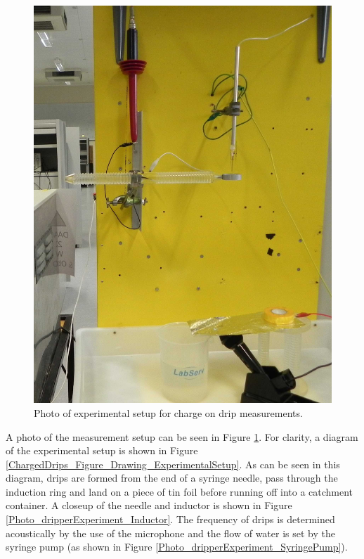 \begin{figure}
    \centering
    \includegraphics[scale=0.15]{content/appendices/chargedWaterDrops/graphics/Photo_dripperExperiment_Setup_draft.JPG}
    \caption{\label{Photo_dripperExperiment_Setup}Photo of experimental setup
    for charge on drip measurements.}
\end{figure}


A photo of the measurement setup can be seen in Figure \ref{Photo_dripperExperiment_Setup}.
For clarity, a diagram of the experimental setup is shown in Figure
\ref{ChargedDrips_Figure_Drawing_ExperimentalSetup}. As can be seen
in this diagram, drips are formed from the end of a syringe needle,
pass through the induction ring and land on a piece of tin foil before
running off into a catchment container. A closeup of the needle and
inductor is shown in Figure \ref{Photo_dripperExperiment_Inductor}.
The frequency of drips is determined acoustically by the use of the
microphone and the flow of water is set by the syringe pump (as shown
in Figure \ref{Photo_dripperExperiment_SyringePump}).

